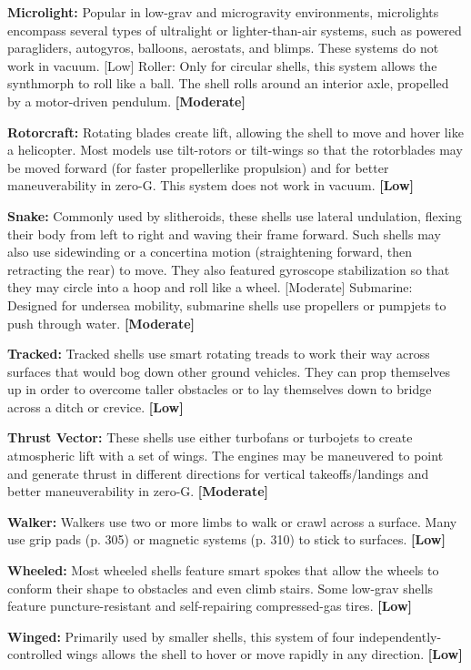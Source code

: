 \textbf{Microlight:} Popular in low-grav and microgravity environments, microlights encompass several types of ultralight or lighter-than-air systems, such as powered paragliders, autogyros, balloons, aerostats, and blimps. These systems do not work in vacuum. [Low] Roller: Only for circular shells, this system allows the synthmorph to roll like a ball. The shell rolls around an interior axle, propelled by a motor-driven pendulum. \textbf{[Moderate]} 

\textbf{Rotorcraft:} Rotating blades create lift, allowing the shell to move and hover like a helicopter. Most models use tilt-rotors or tilt-wings so that the rotorblades may be moved forward (for faster propellerlike propulsion) and for better maneuverability in zero-G. This system does not work in vacuum. \textbf{[Low]} 

\textbf{Snake:} Commonly used by slitheroids, these shells use lateral undulation, flexing their body from left to right and waving their frame forward. Such shells may also use sidewinding or a concertina motion (straightening forward, then retracting the rear) to move. They also featured gyroscope stabilization so that they may circle into a hoop and roll like a wheel. [Moderate] Submarine: Designed for undersea mobility, submarine shells use propellers or pumpjets to push through water. \textbf{[Moderate]} 

\textbf{Tracked:} Tracked shells use smart rotating treads to work their way across surfaces that would bog down other ground vehicles. They can prop themselves up in order to overcome taller obstacles or to lay themselves down to bridge across a ditch or crevice. \textbf{[Low]} 

\textbf{Thrust Vector:} These shells use either turbofans or turbojets to create atmospheric lift with a set of wings. The engines may be maneuvered to point and generate thrust in different directions for vertical takeoffs/landings and better maneuverability in zero-G. \textbf{[Moderate]} 

\textbf{Walker:} Walkers use two or more limbs to walk or crawl across a surface. Many use grip pads (p. 305) or magnetic systems (p. 310) to stick to surfaces. \textbf{[Low]} 

\textbf{Wheeled:} Most wheeled shells feature smart spokes that allow the wheels to conform their shape to obstacles and even climb stairs. Some low-grav shells feature puncture-resistant and self-repairing compressed-gas tires. \textbf{[Low]} 

\textbf{Winged:} Primarily used by smaller shells, this system of four independently-controlled wings allows the shell to hover or move rapidly in any direction. \textbf{[Low]} 

